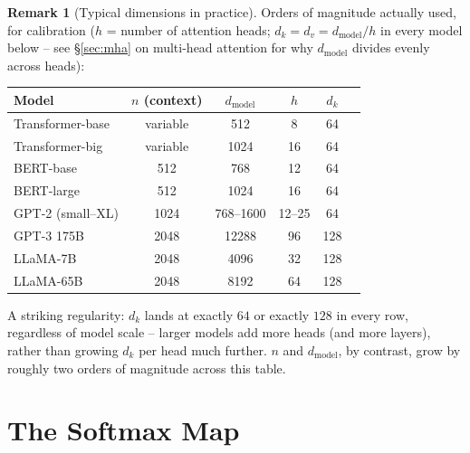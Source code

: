 \documentclass[11pt]{amsart}
\theoremstyle{plain}
\theoremstyle{definition}
\newtheorem{remark}[theorem]{Remark}
\begin{document}
\begin{remark}[Typical dimensions in practice]
\label{rem:typical-dims}
Orders of magnitude actually used, for calibration ($h$ = number of
attention heads; $d_k = d_v = d_{\mathrm{model}}/h$ in every model below --
see \S\ref{sec:mha} on multi-head attention for why $d_{\mathrm{model}}$
divides evenly across heads):

\begin{center}
\begin{tabular}{lccccc}
\hline
Model & $n$ (context) & $d_{\mathrm{model}}$ & $h$ & $d_k$ \\
\hline
Transformer-base \cite{Vaswani2017} & variable\footnotemark & 512 & 8 & 64 \\
Transformer-big \cite{Vaswani2017} & variable\footnotemark[\value{footnote}] & 1024 & 16 & 64 \\
BERT-base \cite{Devlin2018} & 512 & 768 & 12 & 64 \\
BERT-large \cite{Devlin2018} & 512 & 1024 & 16 & 64 \\
GPT-2 (small--XL) \cite{Radford2019} & 1024 & 768--1600 & 12--25 & 64 \\
GPT-3 175B \cite{Brown2020} & 2048 & 12288 & 96 & 128 \\
LLaMA-7B \cite{Touvron2023} & 2048 & 4096 & 32 & 128 \\
LLaMA-65B \cite{Touvron2023} & 2048 & 8192 & 64 & 128 \\
\hline
\end{tabular}
\end{center}

A striking regularity: $d_k$ lands at exactly $64$ or exactly $128$ in
every row, regardless of model scale -- larger models add more heads (and
more layers), rather than growing $d_k$ per head much further. $n$ and
$d_{\mathrm{model}}$, by contrast, grow by roughly two orders of magnitude
across this table.
\end{remark}

\section{The Softmax Map}
\label{sec:softmax}
\end{document}
